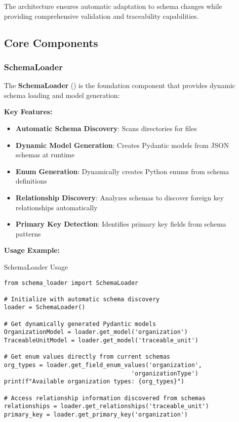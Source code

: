 The architecture ensures automatic adaptation to schema changes while providing comprehensive validation and traceability capabilities.

\subsection{Core Components}
\label{sec:python-core-components}

\subsubsection{SchemaLoader}
\label{sec:python-schema-loader}

The \textbf{SchemaLoader} () is the foundation component that provides dynamic schema loading and model generation:

\textbf{Key Features:}
\begin{itemize}
    \item \textbf{Automatic Schema Discovery}: Scans directories for  files
    \item \textbf{Dynamic Model Generation}: Creates Pydantic models from JSON schemas at runtime
    \item \textbf{Enum Generation}: Dynamically creates Python enums from schema definitions
    \item \textbf{Relationship Discovery}: Analyzes schemas to discover foreign key relationships automatically
    \item \textbf{Primary Key Detection}: Identifies primary key fields from schema patterns
\end{itemize}

\textbf{Usage Example:}

\begin{pythonexample}{SchemaLoader Usage}
\begin{verbatim}
from schema_loader import SchemaLoader

# Initialize with automatic schema discovery
loader = SchemaLoader()

# Get dynamically generated Pydantic models
OrganizationModel = loader.get_model('organization')
TraceableUnitModel = loader.get_model('traceable_unit')

# Get enum values directly from current schemas
org_types = loader.get_field_enum_values('organization', 
                                    'organizationType')
print(f"Available organization types: {org_types}")

# Access relationship information discovered from schemas
relationships = loader.get_relationships('traceable_unit')
primary_key = loader.get_primary_key('organization')
\end{verbatim}
\end{pythonexample}

